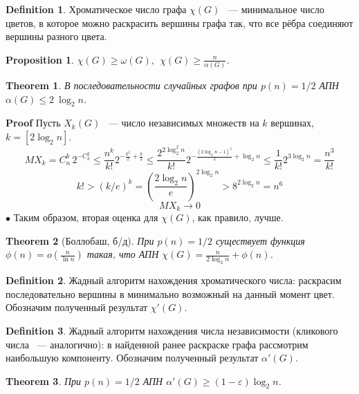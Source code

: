 \documentclass[a4paper]{article}
\theoremstyle{plain}
\newtheorem{theorem}{Theorem}
\newtheorem*{proposition-star}{Proposition}
\theoremstyle{remark}
\theoremstyle{definition}
\newtheorem*{definition-star}{Definition}
\renewenvironment{proof}{{\bfseries Proof}}{$\bullet$}
\newcommand{\myequat}[1]{\begin{equation} #1 \nonumber \end{equation}}
\newcommand{\pars}[1]{\left( #1 \right)}
\begin{document}
\begin{definition-star} Хроматическое число графа $\chi(G)$ ~--- минимальное число цветов, в которое можно раскрасить вершины графа так, что все рёбра соединяют вершины разного цвета.
\end{definition-star}
\begin{proposition-star} $\chi(G)\geq \omega(G),\:\: \chi(G)\geq \frac{n}{\alpha(G)}$.
\end{proposition-star}
\begin{theorem} В последовательности случайных графов при $p(n)=1/2$ АПН $\alpha(G)\leq 2\: \log_2 n$.
\end{theorem}
\begin{proof} Пусть $X_k(G)$ ~--- число независимых множеств на $k$ вершинах, $k = [2\log_2 n]$. 
\myequat{MX_k=C_n^k\,2^{-C_k^2}\leq \frac{n^k}{k!}2^{-\frac{k^2}{2}+\frac{k}{2}}\leq \frac{2^{2 \log_2^2 n}}{k!}2^{-\frac{(2\log_2 n - 1)^2}{2}+\log_2 n}\leq\frac{1}{k!}2^{3\log_2 n}=\frac{n^3}{k!}}
\myequat{k!>(k/e)^k=\pars{\frac{2\log_2 n}{e}}^{2\log_2 n}>8^{2\log_2 n}=n^6}
\myequat{MX_k\to 0}
\end{proof}
Таким образом, вторая оценка для $\chi(G)$, как правило, лучше.
\begin{theorem}[Боллобаш, б/д] При $p(n)=1/2$ существует функция $\phi(n)=o\pars{\frac{n}{\ln n}}$ такая, что АПН $\chi(G)= \frac{n}{2\log_2 n}+\phi(n)$.
\end{theorem}
\begin{definition-star} Жадный алгоритм нахождения хроматического числа: раскрасим последовательно вершины в минимально возможный на данный момент цвет. Обозначим полученный результат $\chi'(G)$.
\end{definition-star}
\begin{definition-star} Жадный алгоритм нахождения числа независимости (кликового числа ~--- аналогично): в найденной ранее раскраске графа рассмотрим наибольшую компоненту. Обозначим полученный результат $\alpha'(G)$.
\end{definition-star}
\begin{theorem} При $p(n)=1/2$ АПН $\alpha'(G)\geq (1-\varepsilon)\log_2 n$.
\end{theorem}
\end{document}
